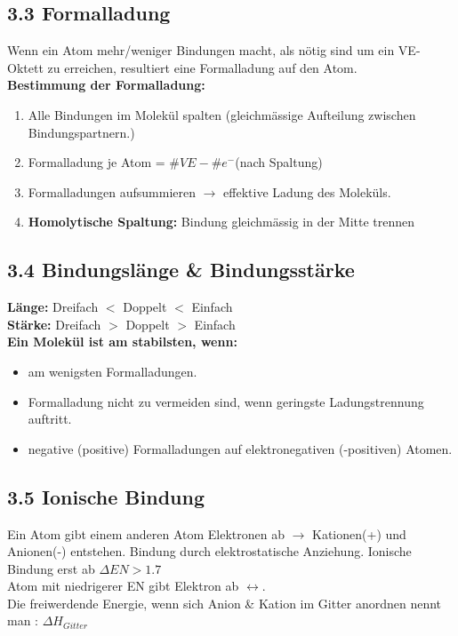 \begin{multicols*}{4}
{\begin{itemize}[noitemsep, leftmargin=*]
    \end{itemize}
}

\subsection{3.3 Formalladung}{
    Wenn ein Atom mehr/weniger Bindungen macht, als nötig sind um ein VE-Oktett zu erreichen, resultiert eine Formalladung auf den Atom.\\
    \textbf{Bestimmung der Formalladung:}
    \begin{enumerate}[noitemsep,leftmargin=*]
        \item Alle Bindungen im Molekül spalten (gleichmässige Aufteilung zwischen Bindungspartnern.)
        \item Formalladung je Atom = $\# VE- \# e^-$(nach Spaltung)
        \item Formalladungen aufsummieren $\rightarrow$ effektive Ladung des Moleküls.
        \item \textbf{Homolytische Spaltung:} Bindung gleichmässig in der Mitte trennen\\
        \vspace{1mm}

    \end{enumerate}
}


\subsection{3.4 Bindungslänge \& Bindungsstärke}{
    \textbf{Länge:} Dreifach $<$ Doppelt $<$ Einfach\\
    \textbf{Stärke:} Dreifach $>$ Doppelt $>$ Einfach\\
    \textbf{Ein Molekül ist am stabilsten, wenn:}
    \begin{itemize}[noitemsep, leftmargin=*]
    \item am wenigsten Formalladungen.\item Formalladung nicht zu vermeiden sind, wenn geringste Ladungstrennung auftritt.\item negative (positive) Formalladungen auf elektronegativen (-positiven) Atomen.
    \end{itemize}
}


\subsection{3.5 Ionische Bindung}{
    Ein Atom gibt einem anderen Atom Elektronen ab $\rightarrow$ Kationen(+) und Anionen(-) entstehen. Bindung durch elektrostatische Anziehung. Ionische Bindung erst ab $\Delta EN > 1.7$\\
    Atom mit niedrigerer EN gibt Elektron ab $\leftrightarrow $.\\
    Die freiwerdende Energie, wenn sich Anion \& Kation im Gitter anordnen nennt man : $\Delta H_{Gitter}$
}



\end{multicols*}
